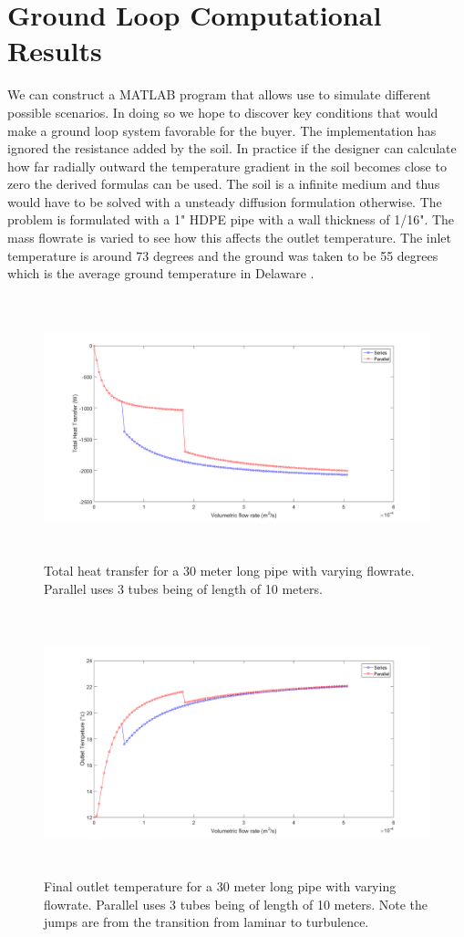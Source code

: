 \section{Ground Loop Computational Results}
%
We can construct a MATLAB program that allows use to simulate different possible scenarios. In doing so we hope to discover key conditions that would make a ground loop system favorable for the buyer. The implementation has ignored the resistance added by the soil. In practice if the designer can calculate how far radially outward the temperature gradient in the soil becomes close to zero the derived formulas can be used. The soil is a infinite medium and thus would have to be solved with a unsteady diffusion formulation otherwise. The problem is formulated with a 1" HDPE pipe with a wall thickness of 1/16". The mass flowrate is varied to see how this affects the outlet temperature. The inlet temperature is around 73 degrees and the ground was taken to be 55 degrees which is the average ground temperature in Delaware \cite{SoilTemps}.
%
\begin{figure}[H]
    \centering
    \includegraphics[height=3in]{pictures/heat_11_ground_23_inlet.png}
    \caption{Total heat transfer for a 30 meter long pipe with varying flowrate. Parallel uses 3 tubes being of length of 10 meters.}
\end{figure}
%
\begin{figure}[H]
    \centering
    \includegraphics[height=3in]{pictures/outlet_11_ground_23_inlet.png}
    \caption{Final outlet temperature for a 30 meter long pipe with varying flowrate. Parallel uses 3 tubes being of length of 10 meters. Note the jumps are from the transition from laminar to turbulence.}
\end{figure}
